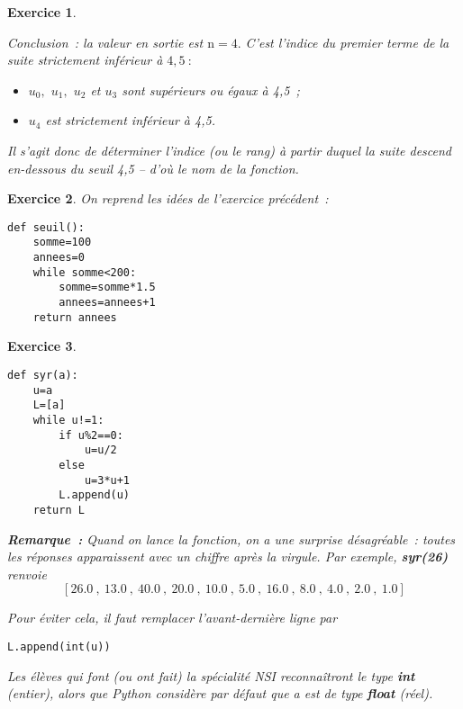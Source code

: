 \documentclass[10pt]{article}
\newtheorem{exo}{Exercice}
\begin{document}
\begin{exo}
\begin{multicols}{2}
\vspace*{0.25cm}


\end{multicols}


\medskip

Conclusion~: la valeur en sortie est $\text{n}=4.$ C'est l'indice du premier terme de la suite strictement inférieur à $4,5~:$
\begin{itemize}
\item[\textbullet] $u_0,$ $u_1,$ $u_2$ et $u_3$ sont supérieurs ou égaux à 4,5~;
\item[\textbullet] $u_4$ est strictement inférieur à 4,5.
\end{itemize}

\medskip

Il s'agit donc de déterminer l'indice (ou le rang) à partir duquel la suite descend en-dessous du seuil  4,5 -- d'où le nom de la fonction.

\end{exo}

\begin{exo}

On reprend les idées de l'exercice précédent~:

\begin{lstlisting}
def seuil():
	somme=100
	annees=0
	while somme<200:
		somme=somme*1.5
		annees=annees+1
	return annees
\end{lstlisting}




\end{exo}

\begin{exo}

~{}

\begin{lstlisting}
def syr(a):
	u=a
	L=[a]
	while u!=1:
		if u%2==0:
			u=u/2
		else
			u=3*u+1
		L.append(u)
	return L
\end{lstlisting}



\medskip

\textbf{Remarque~:} Quand on lance la fonction, on a une surprise désagréable~: toutes les réponses apparaissent avec un chiffre après la virgule. Par exemple, \textbf{syr(26)} renvoie
\[\left[26.0~,~13.0~,~40.0~,~20.0~,~10.0~,~5.0~,~16.0~,~8.0~,~4.0~,~2.0~,~1.0\right]\]

Pour éviter cela, il faut remplacer l'avant-dernière ligne par 


\begin{lstlisting}
L.append(int(u))
\end{lstlisting}


\medskip

Les élèves qui font (ou ont fait) la spécialité NSI reconnaîtront le type \textbf{int} (entier), alors que Python considère par défaut que a est de type \textbf{float} (réel).


\end{exo} 
\end{document}
